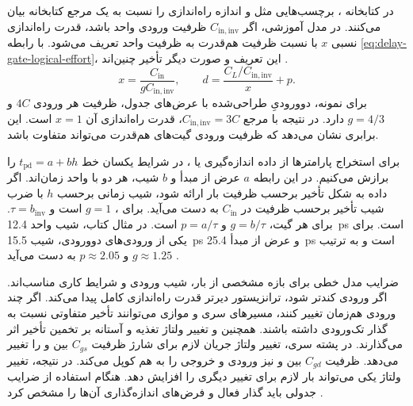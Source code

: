 در کتابخانه ، برچسب‌هایی مثل  و
 اندازه راه‌اندازی را نسبت به یک مرجع کتابخانه بیان
می‌کنند. در مدل آموزشی، اگر \(C_{\mathrm{in,inv}}\) ظرفیت
ورودی  واحد باشد، قدرت راه‌اندازی نسبی \(x\)
با نسبت ظرفیت  هم‌قدرت به ظرفیت
 واحد تعریف می‌شود. با رابطه
\eqref{eq:delay-gate-logical-effort}، این تعریف و صورت دیگر
تأخیر چنین‌اند \cite[روابط  و
، صفحه ۱۵۹]{weste}.
\begin{equation}
  x=\frac{C_{\mathrm{in}}}{gC_{\mathrm{in,inv}}},\qquad
  d=\frac{C_L/C_{\mathrm{in,inv}}}{x}+p.
  \label{eq:delay-gate-drive}
\end{equation}
برای نمونه،  دوورودیِ طراحی‌شده با عرض‌های جدول،
ظرفیت هر ورودی \(4C\) و \(g=4/3\) دارد. در نتیجه با مرجع
\(C_{\mathrm{in,inv}}=3C\)، قدرت راه‌اندازی آن \(x=1\) است.
این برابری نشان می‌دهد که ظرفیت ورودی گیت‌های هم‌قدرت می‌تواند
متفاوت باشد.

برای استخراج پارامترها از داده اندازه‌گیری یا ،
در شرایط یکسان خط \(t_{\mathrm{pd}}=a+b h\) را برازش می‌کنیم.
در این رابطه \(a\) عرض از مبدأ و \(b\) شیب، هر دو با واحد زمان‌اند.
اگر داده به شکل تأخیر برحسب ظرفیت بار ارائه شود، شیب زمانی
برحسب \(h\) با ضرب شیب تأخیر برحسب ظرفیت در \(C_{\mathrm{in}}\)
به دست می‌آید. برای ، \(g=1\) است و
\(\tau=b_{\mathrm{inv}}\). برای هر گیت، \(g=b/\tau\) و
\(p=a/\tau\) است. در مثال کتاب، شیب  واحد
\qty{12.4}{\pico\second} است. برای یکی از ورودی‌های
 دوورودی، شیب \qty{15.5}{\pico\second} و عرض
از مبدأ \qty{25.4}{\pico\second} است و به ترتیب \(g\approx1.25\)
و \(p\approx2.05\) به دست می‌آید
\cite[بخش  و روابط 
و ، صفحات ۱۵۹ و ۱۶۰]{weste}.

ضرایب مدل خطی برای بازه مشخصی از بار، شیب ورودی و شرایط کاری
مناسب‌اند. اگر ورودی کندتر شود، ترانزیستور دیرتر قدرت راه‌اندازی
کامل پیدا می‌کند. اگر چند ورودی هم‌زمان تغییر کنند، مسیرهای سری
و موازی می‌توانند تأخیر متفاوتی نسبت به گذار تک‌ورودی داشته باشند.
همچنین  و تغییر ولتاژ تغذیه و آستانه
بر تخمین تأخیر اثر می‌گذارند. در پشته سری، تغییر ولتاژ
 جریان لازم برای شارژ ظرفیت \(C_{gs}\) بین
 و  را تغییر می‌دهد. ظرفیت \(C_{gd}\)
بین  و  نیز ورودی و خروجی را به هم
کوپل می‌کند. در نتیجه، تغییر ولتاژ یکی می‌تواند بار لازم برای
تغییر دیگری را افزایش دهد. هنگام استفاده از ضرایب
جدولی باید گذار فعال و فرض‌های اندازه‌گذاری آن‌ها را مشخص کرد
\cite[بخش ، صفحات ۱۶۰ تا ۱۶۳]{weste}.
